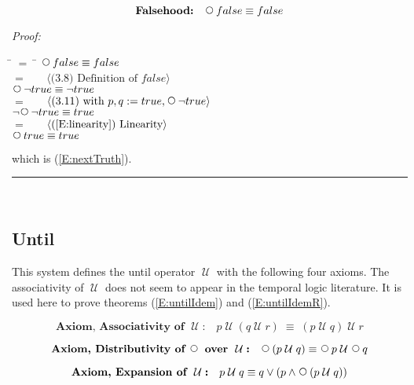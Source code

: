 \documentclass[fleqn, leqno]{article}
\newcommand{\lgap}{2pt} %
\newcommand{\mymathindent}{24pt} %
\newcommand{\equivs}{\ensuremath{\;\equiv\;}} %
\newcommand{\Until}{\;\mathcal{U}\;}
\newcommand{\Next}{\;\,\text{\raisebox{3.5pt}{\circle{6}}}}
\newcommand{\myqed}{\hfill\rule[-.23ex]{1.2ex}{2.0ex}}
\newcommand{\spacer}{\vspace{-30pt}}
\newcommand{\Gll} {\langle} %
\newcommand{\Ggg} {\rangle} %
\newcommand{\Hint}[1] {\ \ \ $\Gll \mbox{#1} \Ggg$ } %
\begin{document}
\begin{equation}\label{E:nextFalse}
\textbf{Falsehood:}\quad \Next false \equiv false
\end{equation}

\emph{Proof:}
\begin{tabbing}
\hspace{\mymathindent} \= $= \;$ \= \kill
\> \> $\Next false \equiv false$\\[\lgap]
\> $=$ \> \Hint{(3.8) Definition of $false$} \\[\lgap]
\> \> $\Next\lnot true \equiv \lnot true$\\[\lgap]
\> $=$ \> \Hint{(3.11) with $p,q := true, \Next\lnot true$}\\[\lgap]
\> \> $\lnot\Next\lnot true \equiv true$\\[\lgap]
\> $=$ \> \Hint{(\ref{E:linearity}) Linearity}\\[\lgap]
\> \> $\Next true \equiv true$\\[\lgap]
\end{tabbing}
which is (\ref{E:nextTruth}). \myqed\\[\lgap]

\subsection{Until}

This system defines the until operator $\Until$ with the following four axioms.
The associativity of $\Until$ does not seem to appear in the temporal logic literature.
It is used here to prove theorems (\ref{E:untilIdem}) and (\ref{E:untilIdemR}).

\begin{equation}\label{E:assocUntil}
\textbf{Axiom, Associativity of $\Until$:}\quad p \Until (q\Until r) \equivs (p\Until q)\Until r
\end{equation}

\spacer

\begin{equation}\label{E:distNextUntil}
\textbf{Axiom, Distributivity of $\Next$ over $\Until$:}\quad \Next (p \Until q) \equiv \Next p \Until \Next q
\end{equation}

\spacer

\begin{equation}\label{E:expansionUntil}
\textbf{Axiom, Expansion of $\Until$:}\quad p \Until q \equiv q \lor (p \land \Next (p \Until q))
\end{equation}
\end{document}
